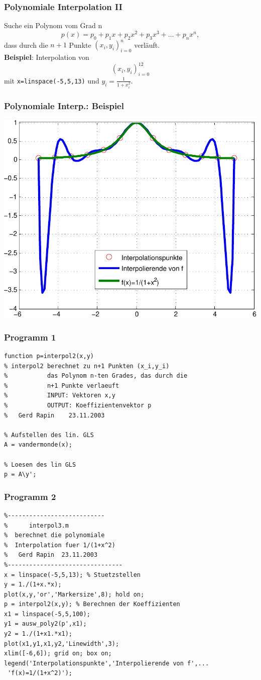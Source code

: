 % 
% 
\begin{frame}[fragile]\frametitle{Polynomiale Interpolation II}
Suche ein Polynom vom Grad n
\[ p(x)= p_0 +p_1 x +p_2 x^2 +p_3 x^3+ \dots +p_n x^n,  \]
 dass durch die  $n+1$ Punkte $(x_i,y_i)_{i=0}^n$
verläuft.\\[1cm]

\textbf{Beispiel}: Interpolation von
\[ (x_i,y_i)_{i=0}^{12} \]
mit \lstinline!x=linspace(-5,5,13)! und $y_i=\frac{1}{1+x_i^2}$. 
\end{frame}
% 
% 
\begin{frame}[fragile]\frametitle{Polynomiale Interp.: Beispiel}
\includegraphics[width=\linewidth]{./figures/grafik_7}
\end{frame}
% 
% 
\begin{frame}[fragile]\frametitle{Programm 1}
\begin{lstlisting}
function p=interpol2(x,y)
% interpol2 berechnet zu n+1 Punkten (x_i,y_i)
%           das Polynom n-ten Grades, das durch die
%           n+1 Punkte verlaeuft
%           INPUT: Vektoren x,y
%           OUTPUT: Koeffizientenvektor p
%   Gerd Rapin    23.11.2003

% Aufstellen des lin. GLS
A = vandermonde(x);

% Loesen des lin GLS
p = A\y';
\end{lstlisting}
\end{frame}
% 
% 
\begin{frame}[fragile]\frametitle{Programm 2}
\begin{lstlisting}
%---------------------------
%      interpol3.m
%  berechnet die polynomiale
%  Interpolation fuer 1/(1+x^2)
%   Gerd Rapin  23.11.2003
%--------------------------------
x = linspace(-5,5,13); % Stuetzstellen
y = 1./(1+x.*x);
plot(x,y,'or','Markersize',8); hold on;
p = interpol2(x,y); % Berechnen der Koeffizienten
x1 = linspace(-5,5,100);
y1 = ausw_poly2(p',x1);
y2 = 1./(1+x1.*x1);
plot(x1,y1,x1,y2,'Linewidth',3);
xlim([-6,6]); grid on; box on;
legend('Interpolationspunkte','Interpolierende von f',...
 'f(x)=1/(1+x^2)');
\end{lstlisting}
\end{frame}

